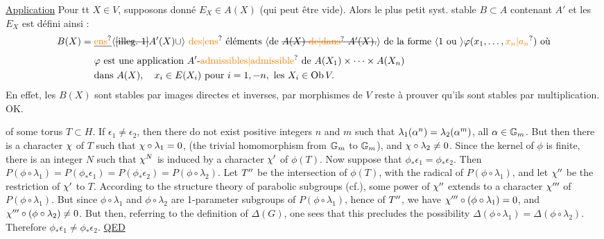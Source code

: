\uline{Application}  Pour tt $X\in V$, supposons donné $E_X\in A(X)$ (qui peut être vide). Alors le plus petit syst. stable $B\subset A$ contenant $A'$ et les $E_X$ est défini ainsi :
\[
\begin{aligned}
B(X)={}&\deleted{\text{\unsure{ens}}}\inserted{\deleted{\text{\illegible{1}}} A'(X)\cup}\text{ \unsure{des|ens} éléments \inserted{de \deleted{$A(X)$ \unsure{de|dans} $A'(X)$.}} de la forme }\inserted{1\text{ ou }}\varphi(x_1,\ldots,\unsure{x_n|a_n})\text{ où}\\
&\varphi\text{ est une application } A'\text{-\unsure{admissibles|admissible} de } A(X_1)\times\cdots\times A(X_n)\\
&\text{dans }A(X),\quad x_i\in E(X_i)\text{ pour }i=1,-n,\text{ les }X_i\in\mathrm{Ob}\,V.
\end{aligned}
\]
En effet, les $B(X)$  sont stables par images directes et inverses,  par morphismes de $V$  reste à prouver qu'ils sont stables par multiplication. OK.

of some torus $T\subset H$. If $\epsilon_1\neq\epsilon_2$, then there do not exist positive integers $n$ and $m$ such that $\lambda_1(\alpha^n)=\lambda_2(\alpha^m)$, all $\alpha\in\mathbb{G}_m$. But then there is a character $\chi$ of $T$ such that $\chi\circ\lambda_1=0$, (the trivial homomorphism from $\mathbb{G}_m$ to $\mathbb{G}_m$), and $\chi\circ\lambda_2\neq0$. Since the kernel of $\phi$ is finite, there is an integer $N$ such that $\chi^N$ is induced by a character $\chi'$ of $\phi(T)$. Now suppose that $\phi_*\epsilon_1=\phi_*\epsilon_2$. Then $P(\phi\circ\lambda_1)=P(\phi_*\epsilon_1)=P(\phi_*\epsilon_2)=P(\phi\circ\lambda_2)$. Let $T^{\prime\prime}$ be the intersection of $\phi(T)$, with the radical of $P(\phi\circ\lambda_1)$, and let $\chi''$ be the restriction of $\chi'$ to $T$. According to the structure theory of parabolic subgroups (cf.\hspace{4em}), some power of $\chi''$ extends to a character $\chi'''$ of $P(\phi\circ\lambda_1)$. But since $\phi\circ\lambda_1$ and $\phi\circ\lambda_2$ are 1-parameter subgroups of $P(\phi\circ\lambda_1)$, hence of $T^{\prime\prime}$, we have $\chi'''\circ(\phi\circ\lambda_1)=0$, and $\chi'''\circ(\phi\circ\lambda_2)\neq0$. But then, referring to the definition of $\Delta(G)$, one sees that this precludes the possibility $\Delta(\phi\circ\lambda_1)=\Delta(\phi\circ\lambda_2)$. Therefore $\phi_*\epsilon_1\neq\phi_*\epsilon_2$. \uline{QED}

